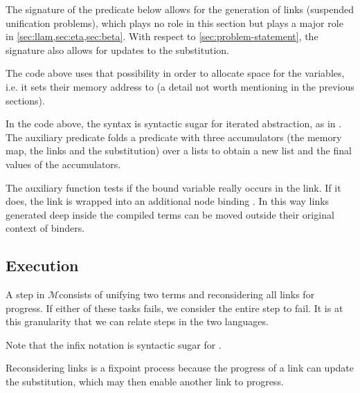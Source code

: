 \documentclass[sigconf,natbib=false,review]{acmart}
\newcommand{\UnifRel}{\ensuremath{\simeq}}
\newcommand{\Ue}{\ensuremath{\UnifRel_m}\xspace}
\newcommand{\Ho}{\texorpdfstring{\ensuremath{\mathcal{M}}\xspace}{M}}
\begin{document}
The signature of the  predicate below allows for the generation of
links (suspended unification problems), which plays no role in this section
but plays a major role in \cref{sec:llam,sec:eta,sec:beta}.
With respect to \cref{sec:problem-statement}, the signature also allows
for updates to the substitution.




\noindent
The code above uses that possibility
in order to allocate space for the variables, i.e. it sets their memory
address to  (a detail not worth mentioning in the
previous sections).



\noindent
In the code above, the syntax  is syntactic sugar for
iterated  abstraction, as in .
The auxiliary predicate  folds a predicate
with three accumulators (the memory map, the links and the substitution)
over a lists to obtain a new list and the final values of the
accumulators.

The auxiliary function  tests if the bound variable
 really occurs in the link. If it does, the link is wrapped into
an additional  node binding . In this way links generated
deep inside the compiled terms can be moved outside their original context
of binders.




\subsection{Execution}
\label{sec:execution}

A step in \Ho consists of unifying two terms and reconsidering all
links for progress. If either of these tasks fails, we consider the entire step to
fail. It is at this granularity that we can relate steps in the
two languages.




\noindent
Note that the infix notation \elpiIn{((A ~\Ue~B) C D)} is syntactic sugar for
\elpiIn{((~\Ue\!\!\!~) A B C D)}.

Reconsidering links is a fixpoint process because the progress of a link
can update the substitution, which may then enable another link to progress.
\end{document}
